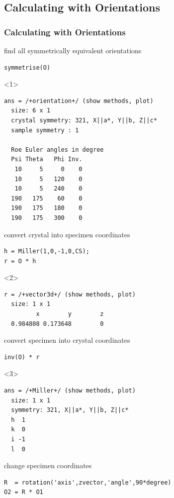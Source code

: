 \documentclass[compress]{beamer}
\begin{document}
\subsection*{Calculating with Orientations}
\label{sec:calc-with-orient}

\begin{frame}
  \frametitle{Calculating with Orientations}


  \begin{overlayarea}{\textwidth}{8cm}
  find all symmetrically equivalent orientations
\begin{lstlisting}[style=input]
symmetrise(O)
\end{lstlisting}
  \begin{onlyenv}<1>
    \vspace{-.3cm}
    \begin{lstlisting}[style=output]
ans = /+orientation+/ (show methods, plot)
  size: 6 x 1
  crystal symmetry: 321, X||a*, Y||b, Z||c*
  sample symmetry : 1

  Roe Euler angles in degree
  Psi Theta   Phi Inv.
   10     5     0    0
   10     5   120    0
   10     5   240    0
  190   175    60    0
  190   175   180    0
  190   175   300    0
\end{lstlisting}
  \end{onlyenv}

  \pause
  \medskip

  convert crystal into specimen coordinates
\begin{lstlisting}[style=input]
h = Miller(1,0,-1,0,CS);
r = O * h
\end{lstlisting}
  \begin{onlyenv}<2>
    \vspace{-.3cm}
    \begin{lstlisting}[style=output]
r = /+vector3d+/ (show methods, plot)
  size: 1 x 1
         x        y        z
  0.984808 0.173648        0
\end{lstlisting}
  \end{onlyenv}

  \pause
  \medskip

  convert specimen into crystal coordinates
\begin{lstlisting}[style=input]
inv(O) * r
\end{lstlisting}
  \begin{onlyenv}<3>
    \vspace{-.3cm}
    \begin{lstlisting}[style=output]
ans = /+Miller+/ (show methods, plot)
  size: 1 x 1
  symmetry: 321, X||a*, Y||b, Z||c*
  h  1
  k  0
  i -1
  l  0
\end{lstlisting}
  \end{onlyenv}

  \pause
  \medskip

  change specimen coordinates
  \begin{lstlisting}[style=input]
R  = rotation('axis',zvector,'angle',90*degree)
O2 = R * O1
\end{lstlisting}
\end{overlayarea}

\end{frame}
\end{document}
